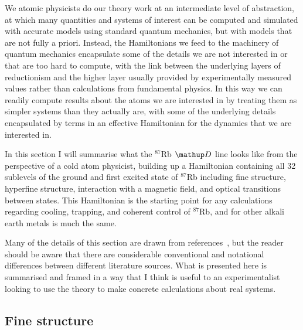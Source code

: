 We atomic physicists do our theory work at an intermediate level of abstraction, at which many quantities and systems of interest can be computed and simulated with accurate models using standard quantum mechanics, but with models that are not fully a priori. Instead, the Hamiltonians we feed to the machinery of quantum mechanics encapsulate some of the details we are not interested in or that are too hard to compute, with the link between the underlying layers of reductionism and the higher layer usually provided by experimentally measured values rather than calculations from fundamental physics. In this way we can readily compute results about the atoms we are interested in by treating them as simpler systems than they actually are, with some of the underlying details encapsulated by terms in an effective Hamiltonian for the dynamics that we are interested in.

In this section I will summarise what the $^{87}$Rb $\up{D}$ line looks like from the perspective of a cold atom physicist, building up a Hamiltonian containing all 32 sublevels of the ground and first excited state of $^{87}$Rb including fine structure, hyperfine structure, interaction with a magnetic field, and optical transitions between states. This Hamiltonian is the starting point for any calculations regarding cooling, trapping, and coherent control of $^{87}$Rb, and for other alkali earth metals is much the same.

Many of the details of this section are drawn from references~\cite{steck_rubidium_2015, steck_quantum_2017, metcalf_laser_1999, king_angular_2008, farrell_consistency_1995}, but the reader should be aware that there are considerable conventional and notational differences between different literature sources. What is presented here is summarised and framed in a way that I think is useful to an experimentalist looking to use the theory to make concrete calculations about real systems.

\subsection{Fine structure}\label{sec:fine_structure}

